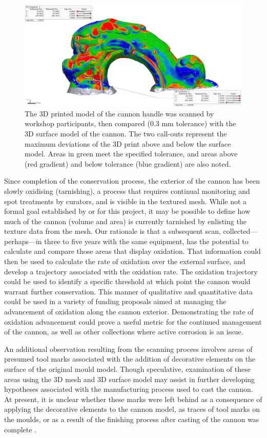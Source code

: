 \documentclass[review]{elsarticle}
\begin{document}
\begin{figure}[ht]\centering
\includegraphics[width=\linewidth]{CannonCompare}
\caption{The 3D printed model of the cannon handle was scanned by workshop participants, then compared (0.3 mm tolerance) with the 3D surface model of the cannon. The two call-outs represent the maximum deviations of the 3D print above and below the surface model. Areas in green meet the specified tolerance, and areas above (red gradient) and below tolerance (blue gradient) are also noted.}
\label{fig:Fig6}
\end{figure}

Since completion of the conservation process, the exterior of the cannon has been slowly oxidising (tarnishing), a process that requires continual monitoring and spot treatments by curators, and is visible in the textured mesh. While not a formal goal established by or for this project, it may be possible to define how much of the cannon (volume and area) is currently tarnished by enlisting the texture data from the mesh. Our rationale is that a subsequent scan, collected---perhaps---in three to five years with the same equipment, has the potential to calculate and compare those areas that display oxidation. That information could then be used to calculate the rate of oxidation over the external surface, and develop a trajectory associated with the oxidation rate. The oxidation trajectory could be used to identify a specific threshold at which point the cannon would warrant further conservation. This manner of qualitative and quantitative data could be used in a variety of funding proposals aimed at managing the advancement of oxidation along the cannon exterior. Demonstrating the rate of oxidation advancement could prove a useful metric for the continued management of the cannon, as well as other collections where active corrosion is an issue.

An additional observation resulting from the scanning process involves areas of presumed tool marks associated with the addition of decorative elements on the surface of the original mould model. Though speculative, examination of these areas using the 3D mesh and 3D surface model may assist in further developing hypotheses associated with the manufacturing process used to cast the cannon. At present, it is unclear whether these marks were left behind as a consequence of applying the decorative elements to the cannon model, as traces of tool marks on the moulds, or as a result of the finishing process after casting of the cannon was complete \cite[358]{RN5763}.
\end{document}
